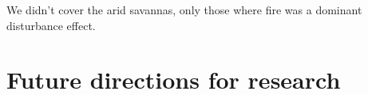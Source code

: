 \begin{refsection}
We didn't cover the arid savannas, only those where fire was a dominant disturbance effect. 




\section{Future directions for research}


\end{refsection}
